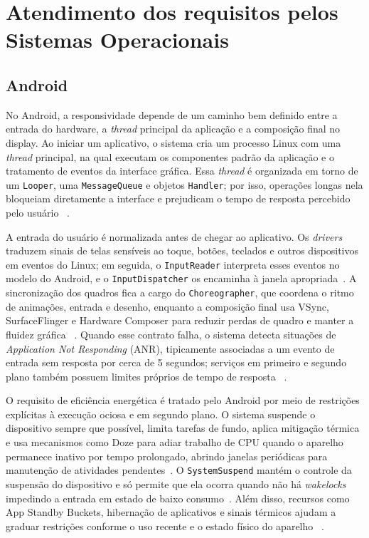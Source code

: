\documentclass[12pt,a4paper]{article}
\begin{document}
\section{Atendimento dos requisitos pelos Sistemas Operacionais}
\label{sec:atendimento}

\subsection{Android}

No Android, a responsividade depende de um caminho bem definido entre a entrada
do hardware, a \emph{thread} principal da aplicação e a composição final no
display. Ao iniciar um aplicativo, o sistema cria um processo Linux com uma
\emph{thread} principal, na qual executam os componentes padrão da aplicação e o
tratamento de eventos da interface gráfica. Essa \emph{thread} é organizada em
torno de um \texttt{Looper}, uma \texttt{MessageQueue} e objetos
\texttt{Handler}; por isso, operações longas nela bloqueiam diretamente a
interface e prejudicam o tempo de resposta percebido pelo usuário
~\cite{android_process_threads}.

A entrada do usuário é normalizada antes de chegar ao aplicativo. Os
\emph{drivers} traduzem sinais de telas sensíveis ao toque, botões, teclados e
outros dispositivos em eventos do Linux; em seguida, o \texttt{InputReader}
interpreta esses eventos no modelo do Android, e o \texttt{InputDispatcher} os
encaminha à janela apropriada~\cite{android_input}. A sincronização dos quadros
fica a cargo do \texttt{Choreographer}, que coordena o ritmo de animações,
entrada e desenho, enquanto a composição final usa VSync, SurfaceFlinger e
Hardware Composer para reduzir perdas de quadro e manter a fluidez gráfica
~\cite{android_choreographer,aosp}. Quando esse contrato falha, o sistema detecta
situações de \emph{Application Not Responding} (ANR), tipicamente associadas a
um evento de entrada sem resposta por cerca de 5 segundos; serviços em primeiro
e segundo plano também possuem limites próprios de tempo de resposta
~\cite{android_anr}.

O requisito de eficiência energética é tratado pelo Android por meio de
restrições explícitas à execução ociosa e em segundo plano. O sistema suspende o
dispositivo sempre que possível, limita tarefas de fundo, aplica mitigação
térmica e usa mecanismos como Doze para adiar trabalho de CPU quando o aparelho
permanece inativo por tempo prolongado, abrindo janelas periódicas para
manutenção de atividades pendentes~\cite{android_power_platform,androidperf}. O
\texttt{SystemSuspend} mantém o controle da suspensão do dispositivo e só permite
que ela ocorra quando não há \emph{wakelocks} impedindo a entrada em estado de
baixo consumo~\cite{android_systemsuspend}. Além disso, recursos como App Standby
Buckets, hibernação de aplicativos e sinais térmicos ajudam a graduar restrições
conforme o uso recente e o estado físico do aparelho
~\cite{android_app_standby,android_hibernation,android_thermal}.
\end{document}
